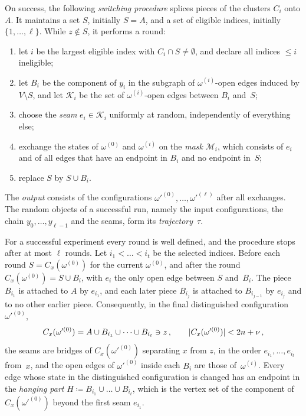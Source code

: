 On success, the following \emph{switching procedure} splices pieces of the clusters $C_i$ onto $A$. It
maintains a set $S$, initially $S=A$, and a set of eligible indices, initially $\{1,\dots,\ell\}$. While
$z\notin S$, it performs a round:
\begin{enumerate}[label=(\roman*)]
  \item let $i$ be the largest eligible index with $C_i\cap S\neq\emptyset$, and declare all indices
  $\le i$ ineligible;
  \item let $B_i$ be the component of $y_i$ in the subgraph of $\omega^{(i)}$-open edges induced by
  $V\setminus S$, and let $\mathcal K_i$ be the set of $\omega^{(i)}$-open edges between $B_i$ and~$S$;
  \item choose the \emph{seam} $e_i\in\mathcal K_i$ uniformly at random, independently of everything
  else;
  \item exchange the states of $\omega^{(0)}$ and $\omega^{(i)}$ on the \emph{mask} $\mathcal M_i$, which
  consists of $e_i$ and of all edges that have an endpoint in $B_i$ and no endpoint in~$S$;
  \item replace $S$ by $S\cup B_i$.
\end{enumerate}
The \emph{output} consists of the configurations $\omega'^{(0)},\dots,\omega'^{(\ell)}$ after all
exchanges. The random objects of a successful run, namely the input configurations, the chain
$y_0,\dots,y_{\ell-1}$ and the seams, form its \emph{trajectory}~$\tau$.

\begin{lemma}\label{lem:switching}
For a successful experiment every round is well defined, and the procedure stops after at most $\ell$
rounds. Let $i_1<\dots<i_t$ be the selected indices. Before each round $S=C_x(\omega^{(0)})$ for the
current $\omega^{(0)}$, and after the round $C_x(\omega^{(0)})=S\cup B_i$, with $e_i$ the only open edge
between $S$ and~$B_i$. The piece $B_{i_1}$ is attached to $A$ by $e_{i_1}$, and each later piece
$B_{i_j}$ is attached to $B_{i_{j-1}}$ by $e_{i_j}$ and to no other earlier piece. Consequently, in the
final distinguished configuration $\omega'^{(0)}$,
\begin{equation}\label{eq:switch-cluster}
  C_x(\omega'^{(0)})=A\cup B_{i_1}\cup\dots\cup B_{i_t}\ni z\,,\qquad
  \lvert C_x(\omega'^{(0)})\rvert<2n+\nu\,,
\end{equation}
the seams are bridges of $C_x(\omega'^{(0)})$ separating $x$ from $z$, in the order
$e_{i_1},\dots,e_{i_t}$ from~$x$, and the open edges of $\omega'^{(0)}$ inside each $B_i$ are those
of~$\omega^{(i)}$. Every edge whose state in the distinguished configuration is changed has an endpoint
in the \emph{hanging part} $H\coloneqq B_{i_1}\cup\dots\cup B_{i_t}$, which is the vertex set of the
component of $C_x(\omega'^{(0)})$ beyond the first seam $e_{i_1}$.
\end{lemma}

